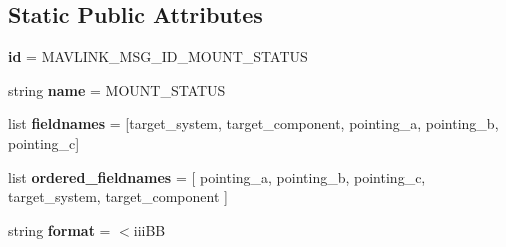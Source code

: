 \subsection*{Static Public Attributes}
\begin{DoxyCompactItemize}
\item 
\mbox{\label{classpymavlink_1_1dialects_1_1v10_1_1MAVLink__mount__status__message_a15d9a554f6174f5fc9985a21fbb38f41}} 
{\bfseries id} = M\+A\+V\+L\+I\+N\+K\+\_\+\+M\+S\+G\+\_\+\+I\+D\+\_\+\+M\+O\+U\+N\+T\+\_\+\+S\+T\+A\+T\+US
\item 
\mbox{\label{classpymavlink_1_1dialects_1_1v10_1_1MAVLink__mount__status__message_a899c653ced5c363b47120deb2fe883e1}} 
string {\bfseries name} = \textquotesingle{}M\+O\+U\+N\+T\+\_\+\+S\+T\+A\+T\+US\textquotesingle{}
\item 
\mbox{\label{classpymavlink_1_1dialects_1_1v10_1_1MAVLink__mount__status__message_a0fd706e3d281966cb5be0492e43c5357}} 
list {\bfseries fieldnames} = \mbox{[}\textquotesingle{}target\+\_\+system\textquotesingle{}, \textquotesingle{}target\+\_\+component\textquotesingle{}, \textquotesingle{}pointing\+\_\+a\textquotesingle{}, \textquotesingle{}pointing\+\_\+b\textquotesingle{}, \textquotesingle{}pointing\+\_\+c\textquotesingle{}\mbox{]}
\item 
\mbox{\label{classpymavlink_1_1dialects_1_1v10_1_1MAVLink__mount__status__message_a01afb94116d389338e68ea072e118de6}} 
list {\bfseries ordered\+\_\+fieldnames} = \mbox{[} \textquotesingle{}pointing\+\_\+a\textquotesingle{}, \textquotesingle{}pointing\+\_\+b\textquotesingle{}, \textquotesingle{}pointing\+\_\+c\textquotesingle{}, \textquotesingle{}target\+\_\+system\textquotesingle{}, \textquotesingle{}target\+\_\+component\textquotesingle{} \mbox{]}
\item 
\mbox{\label{classpymavlink_1_1dialects_1_1v10_1_1MAVLink__mount__status__message_a71a5f452e07959f6c1015562f3e646ea}} 
string {\bfseries format} = \textquotesingle{}$<$iii\+BB\textquotesingle{}

\end{DoxyCompactItemize}
